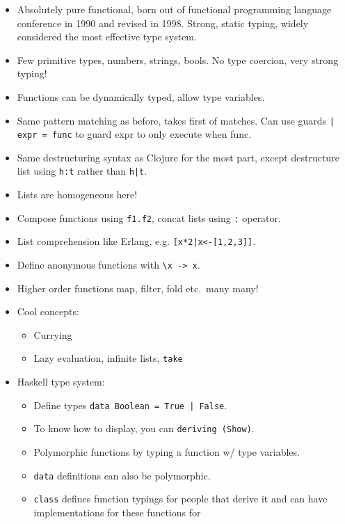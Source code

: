 \documentclass[10pt]{article}
\begin{document}
\begin{itemize}
    \item Absolutely pure functional, born out of functional programming
        language conference in 1990 and revised in 1998. Strong, static typing,
        widely considered the most effective type system.
    \item Few primitive types, numbers, strings, bools. No type coercion, very
        strong typing!
    \item Functions can be dynamically typed, allow type variables.
    \item Same pattern matching as before, takes first of matches. Can use
        guards \lstinline{| expr = func} to guard expr to only execute when
        func.
    \item Same destructuring syntax as Clojure for the most part, except
        destructure list using \lstinline{h:t} rather than \lstinline{h|t}.
    \item Lists are homogeneous here!
    \item Compose functions using \lstinline{f1.f2}, concat lists using
        \lstinline{:} operator.
    \item List comprehension like Erlang, e.g.
        \lstinline{[x*2|x<-[1,2,3]]}.
    \item Define anonymous functions with \lstinline{\x -> x}.
    \item Higher order functions map, filter, fold etc.\ many many!
    \item Cool concepts:
        \begin{itemize}
            \item Currying
            \item Lazy evaluation, infinite lists, \lstinline{take}
        \end{itemize}
    \item Haskell type system:
        \begin{itemize}
            \item Define types \lstinline{data Boolean = True | False}.
            \item To know how to display, you can \lstinline{deriving (Show)}.
            \item Polymorphic functions by typing a function w/ type variables.
            \item \lstinline{data} definitions can also be polymorphic.
            \item \lstinline{class} defines function typings for people that
                derive it and can have implementations for these functions for

\end{itemize}
\end{itemize}
\end{document}
